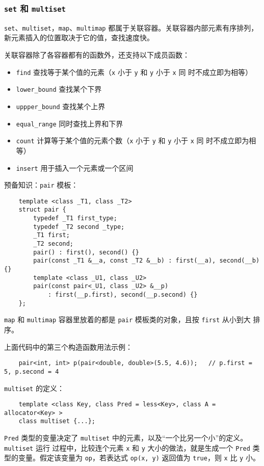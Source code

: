 \documentclass[UTF8]{ctexart}
\begin{document}
\subsubsection{\texttt{set} 和 \texttt{multiset}}
\texttt{set}、\texttt{multiset}，\texttt{map}、\texttt{multimap} 都属于关联容器。关联容器内部元素有序排列，
新元素插入的位置取决于它的值，查找速度快。

关联容器除了各容器都有的函数外，还支持以下成员函数：
\begin{itemize}
    \item \texttt{find} 查找等于某个值的元素（\texttt{x} 小于 \texttt{y} 和 \texttt{y} 小于 \texttt{x} 同
    时不成立即为相等）
    \item \texttt{lower\_bound} 查找某个下界
    \item \texttt{uppper\_bound} 查找某个上界
    \item \texttt{equal\_range} 同时查找上界和下界
    \item \texttt{count} 计算等于某个值的元素个数（\texttt{x} 小于 \texttt{y} 和 \texttt{y} 小于 \texttt{x} 同
    时不成立即为相等）
    \item \texttt{insert} 用于插入一个元素或一个区间
\end{itemize}

预备知识：\texttt{pair} 模板：
\begin{verbatim}
    template <class _T1, class _T2>
    struct pair {
        typedef _T1 first_type;
        typedef _T2 second _type;
        _T1 first;
        _T2 second;
        pair() : first(), second() {}
        pair(const _T1 &__a, const _T2 &__b) : first(__a), second(__b) {}
        template <class _U1, class _U2>
        pair(const pair<_U1, class _U2> &__p)
            : first(__p.first), second(__p.second) {}
    };
\end{verbatim}
\texttt{map} 和 \texttt{multimap} 容器里放着的都是 \texttt{pair} 模板类的对象，且按 \texttt{first} 从小到大
排序。

上面代码中的第三个构造函数用法示例：
\begin{verbatim}
    pair<int, int> p(pair<double, double>(5.5, 4.6));   // p.first = 5, p.second = 4
\end{verbatim}

\texttt{multiset} 的定义：
\begin{verbatim}
    template <class Key, class Pred = less<Key>, class A = allocator<Key> >
    class multiset {...};
\end{verbatim}
\texttt{Pred} 类型的变量决定了 \texttt{multiset} 中的元素，以及“一个比另一个小”的定义。\texttt{multiset} 运行
过程中，比较连个元素 \texttt{x} 和 \texttt{y} 大小的做法，就是生成一个 \texttt{Pred} 类型的变量。假定该变量为
\texttt{op}，若表达式 \texttt{op(x, y)} 返回值为 \texttt{true}，则 \texttt{x} 比 \texttt{y} 小。
\end{document}
